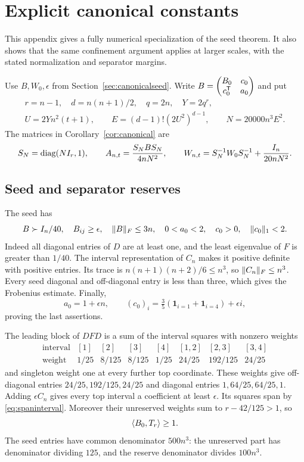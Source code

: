 \section{Explicit canonical constants}\label{app:canonical}
This appendix gives a fully numerical specialization of the seed theorem. It also shows that the same confinement argument applies at larger scales, with the stated normalization and separator margins.

Use $B,W_0,\epsilon$ from Section~\ref{sec:canonicalseed}. Write
$B=\begin{pmatrix}B_0&c_0\\c_0^{\mathsf T}&a_0\end{pmatrix}$ and put
\begin{equation}\label{eq:canonicalparameters}
\begin{gathered}
 r=n-1,\quad d=n(n+1)/2,\quad q=2n,\quad Y=2q^r,\\
 U=2Yn^2(t+1),\qquad
 E=(d-1)!(2U^2)^{d-1},\qquad N=20000n^3E^2.
\end{gathered}
\end{equation}
The matrices in Corollary~\ref{cor:canonical} are
\begin{equation}\label{eq:canonicalcenters}
 S_N=\operatorname{diag}(NI_r,1),\qquad
 A_{n,t}=\frac{S_NBS_N}{4nN^2},\qquad
 W_{n,t}=S_N^{-1}W_0S_N^{-1}+\frac{I_n}{20nN^2}.
\end{equation}

\subsection{Seed and separator reserves}
The seed has
\begin{equation}\label{eq:canonicalreserves}
 B\succ I_n/40,\quad B_{ij}\ge\epsilon,\quad
 \lVert B\rVert_F\le3n,\quad
 0<a_0<2,\quad c_0>0,\quad \lVert c_0\rVert_1<2.
\end{equation}
Indeed all diagonal entries of $D$ are at least one, and the least eigenvalue of $F$ is greater than $1/40$. The interval representation of $C_n$ makes it positive definite with positive entries. Its trace is $n(n+1)(n+2)/6\le n^3$, so $\lVert C_n\rVert_F\le n^3$. Every seed diagonal and off-diagonal entry is less than three, which gives the Frobenius estimate. Finally,
\[
 a_0=1+\epsilon n,\qquad
 (c_0)_i=\tfrac35(\mathbf1_{i=1}+\mathbf1_{i=4})+\epsilon i,
\]
proving the last assertions.

The leading block of $DFD$ is a sum of the interval squares with nonzero weights
\[
\begin{array}{c|rrrrrrr}
 \text{interval}&[1]&[2]&[3]&[4]&[1,2]&[2,3]&[3,4]\\ \hline
 \text{weight}&1/25&8/125&8/125&1/25&24/25&192/125&24/25
\end{array}
\]
and singleton weight one at every further top coordinate. These weights give off-diagonal entries $24/25,192/125,24/25$ and diagonal entries $1,64/25,64/25,1$. Adding $\epsilon C_n$ gives every top interval a coefficient at least $\epsilon$. Its squares span by \eqref{eq:spaninterval}. Moreover their unreserved weights sum to $r-42/125>1$, so
\[
 \langle B_0,T_r\rangle\ge1.
\]
The seed entries have common denominator $500n^3$: the unreserved part has denominator dividing $125$, and the reserve denominator divides $100n^3$.

